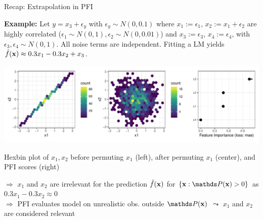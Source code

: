 \documentclass[11pt,compress,t,notes=noshow, aspectratio=169, xcolor=table]{beamer}
\begin{document}
\begin{frame}{Recap: Extrapolation in PFI}
 
 \textbf{Example:} Let $y = x_3 + \epsilon_y$ with $\epsilon_y \sim N(0, 0.1)$ where $x_1 :=  \epsilon_1$, $x_2 := x_1 + \epsilon_2$ are highly correlated ($\epsilon_1 \sim N(0,1), \epsilon_2 \sim N(0, 0.01)$) and $x_3 := \epsilon_3$, $x_4 := \epsilon_4$,  with $\epsilon_3, \epsilon_4 \sim N(0,1)$. All noise terms are independent.
 Fitting a LM yields $\fh(\xv) \approx 0.3 x_1 - 0.3 x_2 + x_3$.

\centerline{\includegraphics[width=0.9\linewidth]{figure_man/pfi_hexbin_extrapolation.pdf}}
\centerline{Hexbin plot of $x_1, x_2$ before permuting $x_1$ (left), after permuting $x_1$ (center), and PFI scores (right)}
\lz
% 
$\Rightarrow$ $x_1$ and $x_2$ are irrelevant for the prediction $\fh(\xv)$ for $\{\xv: \P(\xv) > 0\}$ as $0.3 x_1 - 0.3 x_2 \approx 0$ \\
$\Rightarrow$ PFI evaluates model on unrealistic obs. outside $\P(\xv)$ $\leadsto$ $x_1$ and $x_2$ are considered relevant

 \end{frame}
\end{document}
